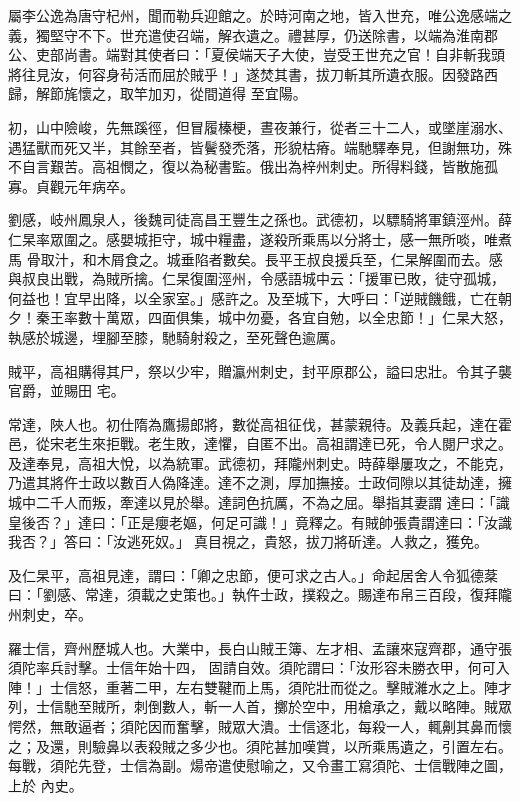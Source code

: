 \begin{pinyinscope}
 屬李公逸為唐守杞州，聞而勒兵迎館之。於時河南之地，皆入世充，唯公逸感端之義，獨堅守不下。世充遣使召端，解衣遺之。禮甚厚，仍送除書，以端為淮南郡公、吏部尚書。端對其使者曰：「夏侯端天子大使，豈受王世充之官！自非斬我頭將往見汝，何容身茍活而屈於賊乎！」遂焚其書，拔刀斬其所遺衣服。因發路西歸，解節旄懷之，取竿加刃，從間道得
 至宜陽。



 初，山中險峻，先無蹊徑，但冒履榛梗，晝夜兼行，從者三十二人，或墜崖溺水、遇猛獸而死又半，其餘至者，皆鬢發禿落，形貌枯瘠。端馳驛奉見，但謝無功，殊不自言艱苦。高祖憫之，復以為秘書監。俄出為梓州刺史。所得料錢，皆散施孤寡。貞觀元年病卒。



 劉感，岐州鳳泉人，後魏司徒高昌王豐生之孫也。武德初，以驃騎將軍鎮涇州。薛仁杲率眾圍之。感嬰城拒守，城中糧盡，遂殺所乘馬以分將士，感一無所啖，唯煮馬
 骨取汁，和木屑食之。城垂陷者數矣。長平王叔良援兵至，仁杲解圍而去。感與叔良出戰，為賊所擒。仁杲復圍涇州，令感語城中云：「援軍已敗，徒守孤城，何益也！宜早出降，以全家室。」感許之。及至城下，大呼曰：「逆賊饑餓，亡在朝夕！秦王率數十萬眾，四面俱集，城中勿憂，各宜自勉，以全忠節！」仁杲大怒，執感於城邊，埋腳至膝，馳騎射殺之，至死聲色逾厲。



 賊平，高祖購得其尸，祭以少牢，贈瀛州刺史，封平原郡公，謚曰忠壯。令其子襲官爵，並賜田
 宅。



 常達，陜人也。初仕隋為鷹揚郎將，數從高祖征伐，甚蒙親待。及義兵起，達在霍邑，從宋老生來拒戰。老生敗，達懼，自匿不出。高祖謂達已死，令人閱尸求之。及達奉見，高祖大悅，以為統軍。武德初，拜隴州刺史。時薛舉屢攻之，不能克，乃遣其將仵士政以數百人偽降達。達不之測，厚加撫接。士政伺隙以其徒劫達，擁城中二千人而叛，牽達以見於舉。達詞色抗厲，不為之屈。舉指其妻謂
 達曰：「識皇後否？」達曰：「正是癭老嫗，何足可識！」竟釋之。有賊帥張貴謂達曰：「汝識我否？」答曰：「汝逃死奴。」真目視之，貴怒，拔刀將斫達。人救之，獲免。



 及仁杲平，高祖見達，謂曰：「卿之忠節，便可求之古人。」命起居舍人令狐德棻曰：「劉感、常達，須載之史策也。」執仵士政，撲殺之。賜達布帛三百段，復拜隴州刺史，卒。



 羅士信，齊州歷城人也。大業中，長白山賊王簿、左才相、孟讓來寇齊郡，通守張須陀率兵討擊。士信年始十四，
 固請自效。須陀謂曰：「汝形容未勝衣甲，何可入陣！」士信怒，重著二甲，左右雙鞬而上馬，須陀壯而從之。擊賊濰水之上。陣才列，士信馳至賊所，刺倒數人，斬一人首，擲於空中，用槍承之，戴以略陣。賊眾愕然，無敢逼者；須陀因而奮擊，賊眾大潰。士信逐北，每殺一人，輒劓其鼻而懷之；及還，則驗鼻以表殺賊之多少也。須陀甚加嘆賞，以所乘馬遺之，引置左右。每戰，須陀先登，士信為副。煬帝遣使慰喻之，又令畫工寫須陀、士信戰陣之圖，上於
 內史。




\end{pinyinscope}
